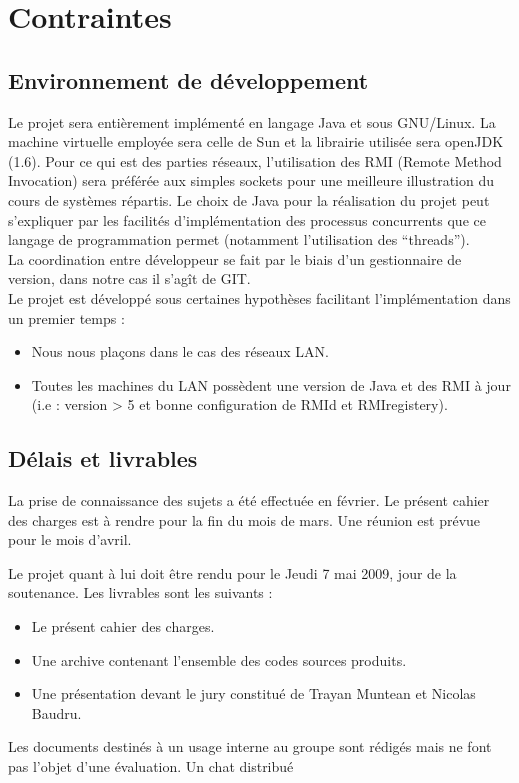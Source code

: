 \documentclass[french,11pt,a4]{article}
\begin{document}
\section{Contraintes}
\subsection{Environnement de développement}

Le projet sera entièrement implémenté en langage Java et sous GNU/Linux. La machine virtuelle employée sera celle de Sun et la librairie utilisée sera openJDK (1.6). Pour ce qui est des parties réseaux, l'utilisation des RMI (Remote Method Invocation) sera préférée aux simples sockets pour une meilleure illustration du cours de systèmes répartis. Le choix de Java pour la réalisation du projet peut s'expliquer par les facilités d'implémentation des processus concurrents que ce langage de programmation permet (notamment l'utilisation des ``threads'').\\

La coordination entre développeur se fait par le biais d'un gestionnaire de version, dans notre cas il s'agît de GIT.\\

Le projet est développé sous certaines hypothèses facilitant l'implémentation dans un premier temps :\\
\begin{itemize}
\item{Nous nous plaçons dans le cas des réseaux LAN.}
\item{Toutes les machines du LAN possèdent une version de Java et des
  RMI à jour (i.e : version > 5 et bonne configuration de RMId et
  RMIregistery).}
\end{itemize}

\subsection{Délais et livrables}

La prise de connaissance des sujets a été effectuée en février. Le présent cahier des charges est à rendre pour la fin du mois de mars. Une réunion est prévue pour le mois d'avril.

Le projet quant à lui doit être rendu pour le Jeudi 7 mai 2009, jour de la soutenance. Les livrables sont les suivants :

\begin{itemize}
\item{Le présent cahier des charges.}
\item{Une archive contenant l'ensemble des codes sources produits.}
\item{Une présentation devant le jury constitué de Trayan Muntean et Nicolas Baudru.}
\end{itemize}
Les documents destinés à un usage interne au groupe sont rédigés mais ne font pas l'objet d'une évaluation.
Un chat distribué
\end{document}
